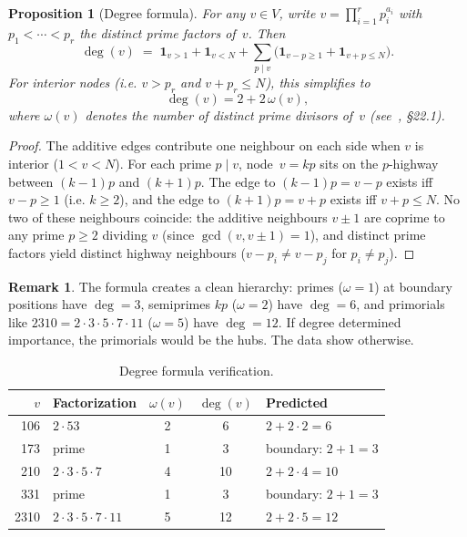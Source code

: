 \documentclass[11pt]{article}
\theoremstyle{plain}
\newtheorem{proposition}[theorem]{Proposition}
\theoremstyle{definition}
\newtheorem{remark}[theorem]{Remark}
\begin{document}
\begin{proposition}[Degree formula]\label{prop:degree}
For any $v \in V$, write $v = \prod_{i=1}^{r} p_i^{a_i}$ with $p_1 < \cdots < p_r$ the
distinct prime factors of~$v$. Then
\begin{equation}\label{eq:degree}
\deg(v) \;=\; \mathbf{1}_{v > 1} + \mathbf{1}_{v < N}
+ \sum_{p \mid v} \bigl(\mathbf{1}_{v - p \ge 1} + \mathbf{1}_{v + p \le N}\bigr).
\end{equation}
For interior nodes (i.e. $v > p_r$ and $v + p_r \le N$), this simplifies to
\begin{equation}\label{eq:degree-interior}
\deg(v) = 2 + 2\,\omega(v),
\end{equation}
where $\omega(v)$ denotes the number of distinct prime divisors of~$v$
(see~\cite{Hardy1979}, \S22.1).
\end{proposition}

\begin{proof}
The additive edges contribute one neighbour on each side when $v$ is interior ($1 < v < N$).
For each prime $p \mid v$, node~$v = kp$ sits on the $p$-highway between $(k-1)p$ and $(k+1)p$.
The edge to $(k-1)p = v - p$ exists iff $v - p \ge 1$ (i.e. $k \ge 2$),
and the edge to $(k+1)p = v + p$ exists iff $v + p \le N$.
No two of these neighbours coincide: the additive neighbours $v \pm 1$ are coprime
to any prime $p \ge 2$ dividing $v$ (since $\gcd(v, v \pm 1) = 1$),
and distinct prime factors yield distinct highway neighbours ($v - p_i \ne v - p_j$ for $p_i \ne p_j$).
\end{proof}

\begin{remark}
The formula creates a clean hierarchy: primes ($\omega = 1$) at boundary positions
have $\deg = 3$, semiprimes $kp$ ($\omega = 2$) have $\deg = 6$,
and primorials like $2310 = 2 \cdot 3 \cdot 5 \cdot 7 \cdot 11$ ($\omega = 5$) have $\deg = 12$.
If degree determined importance, the primorials would be the hubs. The data show otherwise.
\end{remark}

\begin{table}[ht]
\centering
\caption{Degree formula verification.}\label{tab:degree}
\begin{tabular}{@{}rlccl@{}}
\toprule
$v$ & Factorization & $\omega(v)$ & $\deg(v)$ & Predicted \\
\midrule
106 & $2 \cdot 53$ & 2 & 6 & $2 + 2 \cdot 2 = 6$ \\
173 & prime & 1 & 3 & boundary: $2 + 1 = 3$ \\
210 & $2 \cdot 3 \cdot 5 \cdot 7$ & 4 & 10 & $2 + 2 \cdot 4 = 10$ \\
331 & prime & 1 & 3 & boundary: $2 + 1 = 3$ \\
2310 & $2 \cdot 3 \cdot 5 \cdot 7 \cdot 11$ & 5 & 12 & $2 + 2 \cdot 5 = 12$ \\
\bottomrule
\end{tabular}
\end{table}
\end{document}
